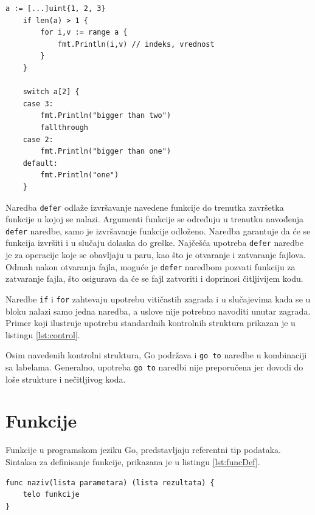 \documentclass[12pt,oneside]{memoir}
\begin{document}
\begin{center}
\begin{lstlisting}[caption=Primer koji demonstrira upotrebu kontrolnih struktura, label={lst:control},  backgroundcolor=\color{background}]
	a := [...]uint{1, 2, 3}
	if len(a) > 1 {
		for i,v := range a {	
			fmt.Println(i,v) // indeks, vrednost
		}
	}

	switch a[2] {
    case 3:
        fmt.Println("bigger than two")
		fallthrough
    case 2:
        fmt.Println("bigger than one")
    default:
        fmt.Println("one")
    }
\end{lstlisting}
\end{center}

Naredba \texttt{defer} odlaže izvršavanje navedene funkcije do trenutka završetka funkcije u kojoj se nalazi. Argumenti funkcije se određuju u trenutku navođenja \texttt{defer} naredbe, samo je izvršavanje funkcije odloženo. Naredba garantuje da će se funkcija izvršiti i u slučaju dolaska do greške. Najčešća upotreba \texttt{defer} naredbe je za operacije koje se obavljaju u paru, kao što je otvaranje i zatvaranje fajlova. Odmah nakon otvaranja fajla, moguće je \texttt{defer} naredbom pozvati funkciju za zatvaranje fajla, što osigurava da će se fajl zatvoriti i doprinosi čitljivijem kodu. 

Naredbe \texttt{if} i \texttt{for} zahtevaju upotrebu vitičastih zagrada i u slučajevima kada se u bloku nalazi samo jedna naredba, a uslove nije potrebno navoditi unutar zagrada. Primer koji ilustruje upotrebu standardnih kontrolnih struktura prikazan je u listingu \ref{lst:control}. 

Osim navedenih kontrolni struktura, Go podržava i \texttt{go to} naredbe u kombinaciji sa labelama. Generalno, upotreba \texttt{go to} naredbi nije preporučena jer dovodi do loše strukture i nečitljivog koda.


\section{Funkcije} \label{func}

Funkcije u programskom jeziku Go, predstavljaju referentni tip podataka. Sintaksa za definisanje funkcije, prikazana je u listingu \ref{lst:funcDef}.

\begin{center}
\begin{lstlisting}[caption=Sintaksa za definisanje funkcije, label={lst:funcDef},  backgroundcolor=\color{background}]
func naziv(lista parametara) (lista rezultata) {
	telo funkcije 
} 
\end{lstlisting}
\end{center}
\end{document}
